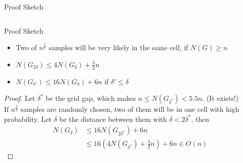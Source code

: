 \documentclass[18pt]{beamer}
\begin{document}
\begin{frame}{Proof Sketch}
\begin{columns}

\end{columns}

\end{frame}

\begin{frame}{Proof Sketch}
\begin{itemize}
\item Two of $n^{\frac{2}{3}}$ samples will be very likely in the same cell, if $N(G) \geq n$ 
\item $N(G_{2\delta}) \leq 4N(G_\delta) + \frac{3}{2}n$
\item $N(G_{\delta'}) \leq 16N(G_\delta) + 6n$ \hspace{2em} if $\delta' \leq \delta$
\end{itemize}

\begin{proof}
Let $\delta^*$ be the grid gap, which makes $n \leq N(G_{\delta^*}) < 5.5n$. (It exists!) \\
If $n^{\frac{2}{3}}$ samples are randomly chosen, two of them will be in one cell with high probability. Let $\delta$ be the distance between them with $\delta < 2\delta^*$, then
\begin{align*}
N(G_{\delta})  &\leq 16N(G_{2\delta^*}) + 6n \\
               &\leq 16(4N(G_{\delta^*})+\frac{3}{2}n)+6n \in O(n)
\end{align*}
 
\end{proof}

\end{frame}

%

\appendix
\beginbackup
\end{document}
